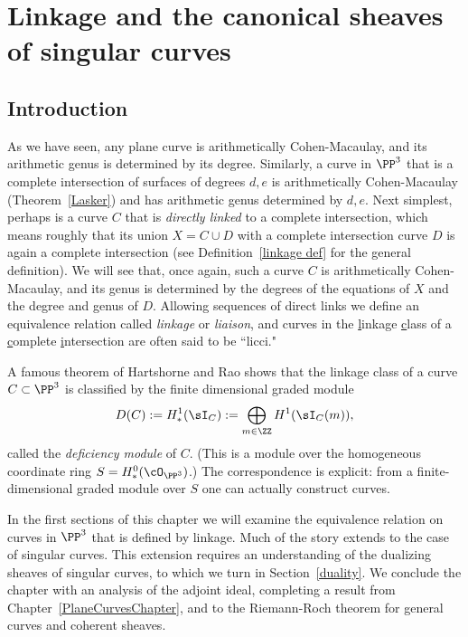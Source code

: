 

\chapter{Linkage and the canonical sheaves of singular curves}
\label{LiaisonChapter}\label{linkageChapter}\label{LinkageChapter}


\section{Introduction} \label{LinkageIntro}


As we have seen, any plane curve is arithmetically Cohen-Macaulay, and its arithmetic genus is determined by its degree. Similarly, a curve in  $\PP^3$ that is a complete intersection of surfaces of degrees $d,e$
is arithmetically Cohen-Macaulay (Theorem~\ref{Lasker}) and has arithmetic genus determined by $d,e$.
 Next simplest, perhaps
is a curve $C$ that is \emph{directly linked} to a complete intersection, which means roughly that its union $X = C\cup D$
with a complete intersection
curve $D$ is again a complete intersection (see Definition~\ref{linkage def} for the general definition). We will see that, once again, such a curve $C$ is arithmetically Cohen-Macaulay,
and its genus is determined by the degrees of the equations of $X$ and the degree and genus of $D$. 
Allowing sequences of direct links we define an equivalence relation called  \emph{linkage} or \emph{liaison}, 
and curves in the {\underline l}inkage {\underline c}lass of a {\underline c}omplete {\underline i}ntersection are often said to be ``licci." 

A famous theorem of Hartshorne and Rao \cite{MR520926} shows that the linkage class of a curve $C\subset \PP^3$
is classified by the finite dimensional graded module 
$$
D(C) :=H^1_*(\sI_C):=\bigoplus_{m\in \ZZ} H^1(\sI_C(m)),
$$
called the \emph{deficiency module} of $C$. (This is a module over the homogeneous coordinate ring $S = H^0_*(\cO_{\PP^3})$.) The correspondence is explicit: from a finite-dimensional graded module over $S$ one can
actually construct curves.

In the first sections of this chapter we will examine the equivalence relation on curves in $\PP^3$ that is defined by linkage. Much of the story extends to the case of singular curves. This extension requires an understanding of the
dualizing sheaves of singular curves, to which we turn in Section~\ref{duality}. We conclude the chapter with an analysis of the adjoint ideal, completing a result from Chapter~\ref{PlaneCurvesChapter},  and to the Riemann-Roch theorem for general curves and coherent sheaves.

